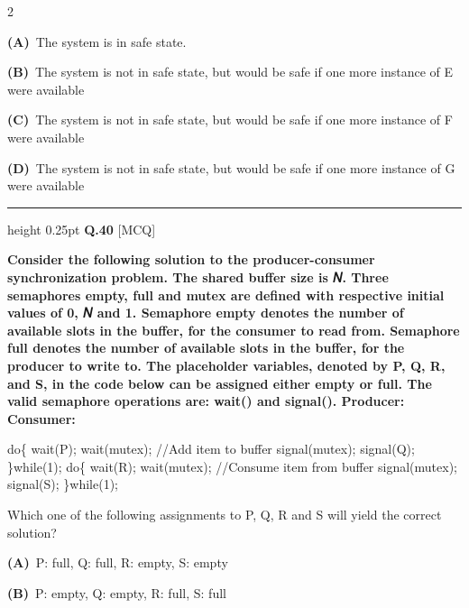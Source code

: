 \documentclass[a4paper,10pt,twoside]{article}
\begin{document}
\begin{multicols}{2}
\par\vspace{2pt}\noindent
\textbf{(A)}~The system is in safe state.\par\vspace{2pt}\noindent
\textbf{(B)}~The system is not in safe state, but would be safe if one more instance of E were \newline available\par\vspace{2pt}\noindent
\textbf{(C)}~The system is not in safe state, but would be safe if one more instance of F were \newline available\par\vspace{2pt}\noindent
\textbf{(D)}~The system is not in safe state, but would be safe if one more instance of G were \newline available
\par\vspace{6pt}\hrule height 0.25pt\vspace{6pt}
\noindent\textbf{Q.40} \hfill {\footnotesize\textsf{[MCQ]}}
\par\vspace{2pt}
{\bfseries Consider the following solution to the producer-consumer synchronization problem. The
shared buffer size is 𝑁. Three semaphores empty, full and mutex are defined with respective
initial values of 0, 𝑁 and 1. Semaphore empty denotes the number of available slots in the
buffer, for the consumer to read from. Semaphore full denotes the number of available slots
in the buffer, for the producer to write to. The placeholder variables, denoted by P, Q, R,
and S, in the code below can be assigned either empty or full. The valid semaphore
operations are: wait() and signal().
Producer:
Consumer:
\par\smallskip
do\{
wait(P);
wait(mutex);
//Add item to buffer
signal(mutex);
signal(Q);
\}while(1);
do\{
wait(R);
wait(mutex);
//Consume item from buffer
signal(mutex);
signal(S);
\}while(1);
\par\smallskip
Which one of the following assignments to P, Q, R and S will yield the correct solution? \par}
\par\vspace{2pt}\noindent
\textbf{(A)}~P: full, Q: full, R: empty, S: empty\par\vspace{2pt}\noindent
\textbf{(B)}~P: empty, Q: empty, R: full, S: full\par\vspace{2pt}\noindent

\end{multicols}
\end{document}
